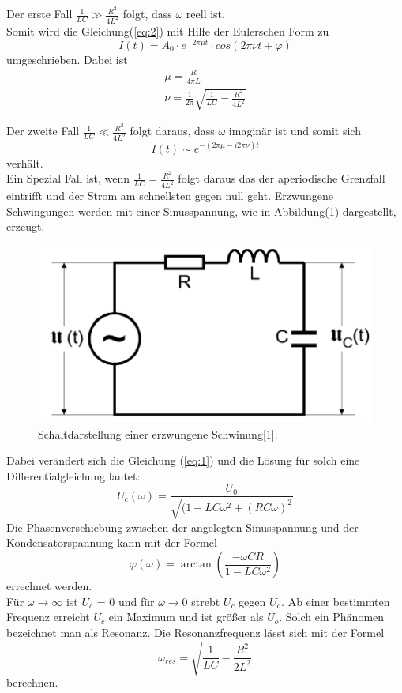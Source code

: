 Der erste Fall $\frac{1}{LC} \gg \frac{R^2}{4L^2}$ folgt, dass $\omega$ reell ist.\\
Somit wird die Gleichung(\ref{eq:2}) mit Hilfe der Eulerschen Form zu
\begin{equation}
  I(t) = A_0 \cdot e^{-2\pi\mu t} \cdot cos(2\pi\nu t + \varphi)
\end{equation}
umgeschrieben. Dabei ist
\begin{align*}
    \mu = \frac{R}{4\pi L} \\
    \nu = \frac{1}{2\pi} \sqrt{\frac{1}{LC} - \frac{R^2}{4L^2}}
\end{align*}

Der zweite Fall $\frac{1}{LC} \ll \frac{R^2}{4L^2}$ folgt daraus, dass $\omega$ imaginär ist
und somit sich
\begin{equation*}
I(t) \sim e^{-(2\pi \mu - i 2 \pi \nu)t}
\end{equation*} verhält.\\
Ein Spezial Fall ist, wenn $\frac{1}{LC} = \frac{R^2}{4L^2}$ folgt daraus das der aperiodische Grenzfall eintrifft
und der Strom am schnellsten gegen null geht.
\newpage
Erzwungene Schwingungen werden mit einer Sinusspannung, wie in Abbildung(\ref{fig:2}) dargestellt, erzeugt.
\begin{figure}[H]
\centering
\includegraphics[width=\textwidth]{Schwingkreis2.png}
\caption{Schaltdarstellung einer erzwungene Schwinung[1].}
\label{fig:2}
\end{figure}

Dabei verändert sich die Gleichung (\ref{eq:1}) und die Lösung für solch eine Differentialgleichung lautet:
\begin{equation}
  U_c(\omega) = \frac{U_0}{\sqrt{(1-LC\omega^2 + (RC\omega)^2}}
  \label{eq:3}
\end{equation}
Die Phasenverschiebung zwischen der angelegten Sinusspannung und der Kondensatorspannung kann mit der Formel
\begin{equation}
\varphi(\omega) = \arctan(\frac{-\omega CR}{1-LC\omega^2})
\label{eq:4}
\end{equation}
errechnet werden.\\
Für $\omega \rightarrow \infty$ ist $U_c$ = 0 und für $\omega \rightarrow 0$ strebt $U_c$ gegen $U_o$.
Ab einer bestimmten Frequenz erreicht $U_c$
ein Maximum und ist größer als $U_o$.
Solch ein Phänomen bezeichnet man als Resonanz.
Die Resonanzfrequenz lässt sich mit der Formel
\begin{equation}
  \omega_{res} = \sqrt{\frac{1}{LC} - \frac{R^2}{2L^2}}
\end{equation}
 berechnen.
